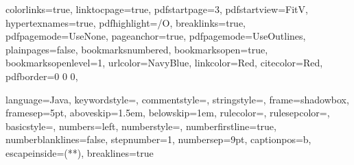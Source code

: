 \graphicspath{{figures/}{../figures/}}

\hypersetup %
{
	colorlinks=true,
	linktocpage=true, 
	pdfstartpage=3,
	pdfstartview=FitV,
	hypertexnames=true,
	pdfhighlight=/O,
	breaklinks=true,
	pdfpagemode=UseNone,
	pageanchor=true,
	pdfpagemode=UseOutlines,
	plainpages=false,
	bookmarksnumbered,
	bookmarksopen=true,
	bookmarksopenlevel=1,
	urlcolor=NavyBlue,
	linkcolor=Red,
	citecolor=Red,
	pdfborder={0 0 0},
}

\usepackage{color}


\lstset %
{
	language=Java,
	keywordstyle=\color{RoyalBlue},
    commentstyle=\color{Green}\ttfamily,
    stringstyle=\color{Red}\ttfamily,
	frame=shadowbox,
	framesep=5pt,
	aboveskip=1.5em,
	belowskip=1em,
	rulecolor=\color{blue!40!black},
	rulesepcolor=\color{white!93!black},
	basicstyle=\ttfamily\normalsize,
	numbers=left,
	numberstyle=\tiny,
	numberfirstline=true,
	numberblanklines=false,
	stepnumber=1,
	numbersep=9pt,	
	captionpos=b,
	escapeinside={(*}{*)},
	breaklines=true
}

\usetikzlibrary{shapes,arrows,external,petri}	